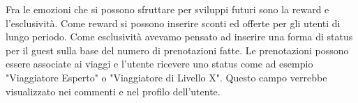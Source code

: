 \documentclass[1_relazione.tex]{subfiles}
\begin{document}
Fra le emozioni che si possono sfruttare per sviluppi futuri sono la reward e l'esclusivit\`{a}. Come reward si possono inserire sconti ed offerte per gli utenti di lungo periodo. Come esclusivit\`{a} avevamo pensato ad inserire una forma di status per il guest sulla base del numero di prenotazioni fatte. Le prenotazioni possono essere associate ai viaggi e l'utente ricevere uno status come ad esempio "Viaggiatore Esperto" o "Viaggiatore di Livello X". Questo campo verrebbe visualizzato nei commenti e nel profilo dell'utente.
\end{document}
